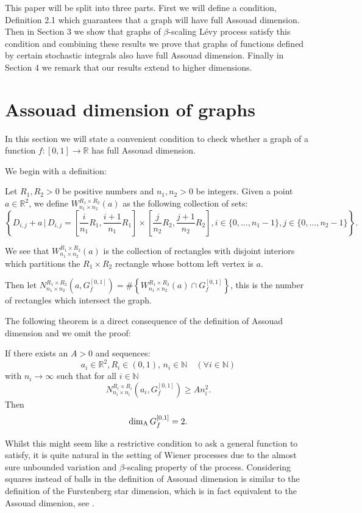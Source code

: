 This paper will be split into three parts. First we will define a condition, Definition 2.1 which guarantees that a graph will have full Assouad dimension. Then in Section 3 we show that graphs of $\beta$-scaling L\'evy process satisfy this condition and combining these results we prove that graphs of functions defined by certain stochastic integrals also have full Assouad dimension. Finally in Section 4 we remark that our results extend to higher dimensions.

\section{Assouad dimension of graphs}
In this section we will state a convenient condition to check whether a graph of a function $f:[0,1]\to\mathbb{R}$ has full Assouad dimension.

We begin with a definition:

\begin{defn}\label{Win}
	Let $R_1,R_2>0$ be positive numbers and $n_1,n_2>0$ be integers. Given a point $a\in\mathbb{R}^2$, we define $W_{n_1\times n_2}^{R_1\times R_2}(a)$ as the following collection of sets:
	\[	
	\left\{D_{i,j}+a \, \vert \, D_{i,j}=\left[\frac{i}{n_1}R_1,\frac{i+1}{n_1}R_1\right]\times \left[\frac{j}{n_2}R_2,\frac{j+1}{n_2}R_2\right], i\in\{0,\dots,n_1-1\}, j\in\{0,\dots,n_2-1\}\right\}.
	\]
	
	We see that $W_{n_1\times n_2}^{R_1\times R_2}(a)$ is the collection of rectangles with disjoint interiors which partitions the $R_1\times R_2$ rectangle whose bottom left vertex is $a$.
	
	Then let $N_{n_1\times n_2}^{R_1 \times R_2 }(a,G_f^{[0,1]})= \# \left\{ W_{n_1\times n_2}^{R_1\times R_2}(a) \cap G_f^{[0,1]} \right\}$, this is the number of rectangles which intersect the graph.
\end{defn}

The following theorem is a direct consequence of the definition of Assouad dimension and we omit the proof:


\begin{thm}\label{graph}
	If there exists an $A>0$ and sequences:
	\[
	a_i\in \mathbb{R}^2,R_i\in (0,1),\, n_i\in\mathbb{N} \quad (\forall i\in \mathbb{N})
	\]
	with $n_i \rightarrow \infty$ such that for all $i\in\mathbb{N}$
	\[
	N_{n_i\times n_i}^{R_i \times R_i }(a_i,G_f^{[0,1]})\geq A n_i^2.
	\]
	Then
	\[
	\dim_{\mathrm{A}} G_f^{[0,1]}=2.
	\]
\end{thm}

Whilst this might seem like a restrictive condition to ask a general function to satisfy, it is quite natural in the setting of Wiener processes due to the almost sure unbounded variation and $\beta$-scaling property of the process. Considering squares instead of balls in the definition of Assouad dimension is similar to the definition of the Furstenberg star dimension, which is in fact equivalent to the Assouad dimenion, see \cite{chenwuwu}.

